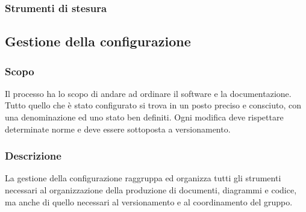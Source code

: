         \subsubsection{Strumenti di stesura}
            \subsubsubsection{\LaTeX}
    \subsection{Gestione della configurazione}
        \subsubsection{Scopo}
        Il processo ha lo scopo di andare ad ordinare il software e la documentazione. Tutto quello che è stato configurato si trova in un posto preciso e consciuto, con una denominazione ed uno stato ben definiti. Ogni modifica deve rispettare determinate norme e deve essere sottoposta a versionamento.
        \subsubsection{Descrizione}
        La gestione della configurazione raggruppa ed organizza tutti gli strumenti necessari al organizzazione della produzione di documenti, diagrammi e codice, ma anche di quello necessari al versionamento e al coordinamento del gruppo.
